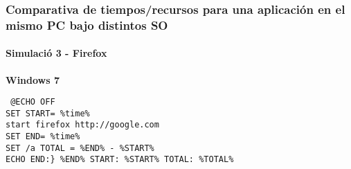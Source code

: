 \documentclass[12pt]{beamer}
\begin{document}

\begin{frame}[fragile]
\frametitle{Comparativa de tiempos/recursos para una aplicación en el mismo PC bajo distintos SO}
\framesubtitle{Simulació 3 - Firefox}
\textbf{Windows 7}	     
  \begin{lstlisting}
 @ECHO OFF
SET START= %time% 
start firefox http://google.com
SET END= %time% 
SET /a TOTAL = %END% - %START%
ECHO END:} %END% START: %START% TOTAL: %TOTAL%
    \end{lstlisting}
\end{frame}
\end{document}
